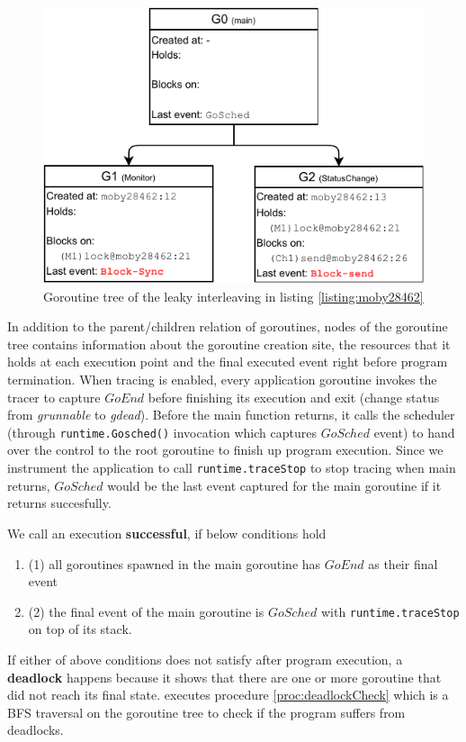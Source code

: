 \begin{figure}[]
\centering
\includegraphics[width=0.75\linewidth]{figs/gtree.pdf}
\caption{Goroutine tree of the leaky interleaving in listing \ref{listing:moby28462}}
\label{fig:gtree}
\end{figure}

%
In addition to the parent/children relation of goroutines, nodes of the goroutine tree contains information about the goroutine creation site, the resources that it holds at each execution point and the final executed event right before program termination.
%
When tracing is enabled, every application goroutine invokes the tracer to capture $GoEnd$ before finishing its execution and exit (\ie change status from \textit{grunnable} to \textit{gdead}\cite{goexit-line-of-code}).
%
Before the main function returns, it calls the scheduler (through \texttt{runtime.Gosched()} invocation which captures $GoSched$ event) to hand over the control to the root goroutine to finish up program execution.
%
Since we instrument the application to call \texttt{runtime.traceStop} to stop tracing when main returns, $GoSched$ would be the last event captured for the main goroutine if it returns succesfully.
%

We call an execution \textbf{successful}, if below conditions hold
\begin{enumerate}
  \item (1) all goroutines spawned in the main goroutine has $GoEnd$ as their final event
  \item (2) the final event of the main goroutine is $GoSched$ with \texttt{runtime.traceStop} on top of its stack.
\end{enumerate}
If either of above conditions does not satisfy after program execution, a \textbf{deadlock} happens because it shows that there are one or more goroutine that did not reach its final state. \goat executes procedure \ref{proc:deadlockCheck} which is a BFS traversal on the goroutine tree to check if the program suffers from deadlocks.

